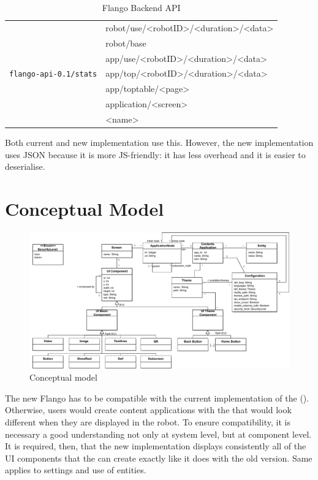 \begin{table}[ht]
\begin{tabularx}{\linewidth}{| l | X |}
    \multirow{7}{*}{\texttt{flango-api-0.1/stats}}
        & robot/use/\textless robotID>/\textless duration\textgreater/<data\textgreater \\
        & robot/base \\
        & app/use/\textless robotID\textgreater/\textless duration\textgreater/<data\textgreater \\
        & app/top/\textless robotID\textgreater/\textless duration\textgreater/<data\textgreater \\
        & app/toptable/\textless page\textgreater \\
        & application/\textless screen\textgreater \\
        & \textless name\textgreater \\
    \hline
    \end{tabularx}
    \caption{Flango Backend \ac{API}}
    \label{tab:flango-api}
\end{table}
Both current and new implementation use this.
However, the new implementation uses \ac{JSON} because it is more \ac{JS}-friendly: it has less overhead and it is easier to deserialise.

\section{Conceptual Model}
\begin{figure}   
    \centering
    \includegraphics[width=\textwidth]{figures/specification-conceptual-model}
    \caption{Conceptual model}
    \label{fig:specification-conceptual-model}
\end{figure}

The new Flango \cm has to be compatible with the current implementation of the \se (\flangofe).
Otherwise, users would create content applications with the \se that would look different when they are displayed in the robot.
To ensure compatibility, it is necessary a good understanding not only at system level, but at component level.
It is required, then, that the new implementation displays consistently all of the \ac{UI} components that the \se can create exactly like it does with the old version. 
Same applies to settings and use of entities.

